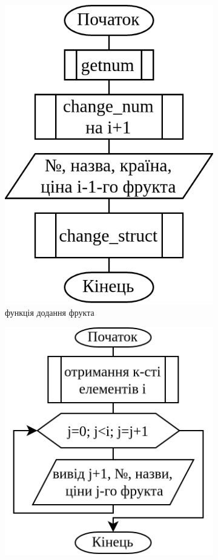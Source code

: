 \documentclass[12pt]{extreport}
\begin{document}
\begin{figure}[h]
\begin{subfigure}[b]{.24\textwidth}
		\includegraphics[width=\textwidth]{fch2/add.png}
		\caption{функція додання фрукта}
	\end{subfigure}
	\hfill
	\begin{subfigure}[b]{.28\textwidth}
	\centering
		\includegraphics[width=\textwidth]{fch2/print.png}

\end{subfigure}
\end{figure}
\end{document}
